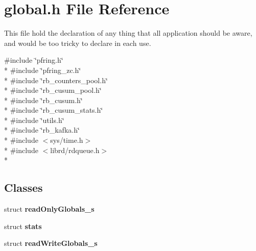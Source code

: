 \section{global.\+h File Reference}
\label{global_8h}


This file hold the declaration of any thing that all application should be aware, and would be too tricky to declare in each use.  


{\ttfamily \#include \char`\"{}pfring.\+h\char`\"{}}\\*
{\ttfamily \#include \char`\"{}pfring\+\_\+zc.\+h\char`\"{}}\\*
{\ttfamily \#include \char`\"{}rb\+\_\+counters\+\_\+pool.\+h\char`\"{}}\\*
{\ttfamily \#include \char`\"{}rb\+\_\+cusum\+\_\+pool.\+h\char`\"{}}\\*
{\ttfamily \#include \char`\"{}rb\+\_\+cusum.\+h\char`\"{}}\\*
{\ttfamily \#include \char`\"{}rb\+\_\+cusum\+\_\+stats.\+h\char`\"{}}\\*
{\ttfamily \#include \char`\"{}utils.\+h\char`\"{}}\\*
{\ttfamily \#include \char`\"{}rb\+\_\+kafka.\+h\char`\"{}}\\*
{\ttfamily \#include $<$sys/time.\+h$>$}\\*
{\ttfamily \#include $<$librd/rdqueue.\+h$>$}\\*
\subsection*{Classes}
\begin{DoxyCompactItemize}
\item 
struct {\bf read\+Only\+Globals\+\_\+s}
\item 
struct {\bf stats}
\item 
struct {\bf read\+Write\+Globals\+\_\+s}
\end{DoxyCompactItemize}
